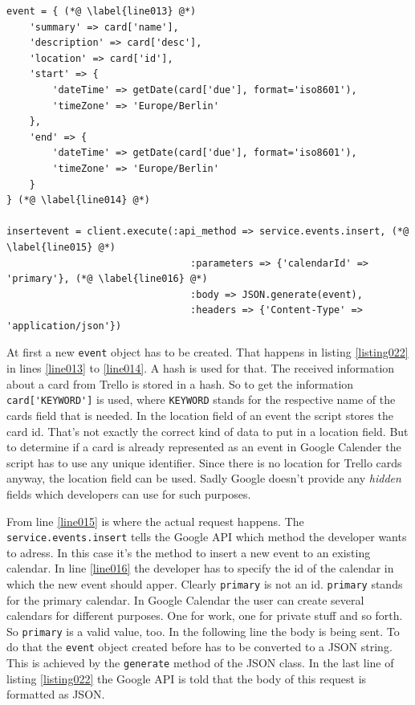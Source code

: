 \begin{lstlisting}[aboveskip=1\baselineskip, caption=Adding a new event to Google Calendar., label=listing022]
event = { (*@ \label{line013} @*)
	'summary' => card['name'],
	'description' => card['desc'],
	'location' => card['id'],
	'start' => {
		'dateTime' => getDate(card['due'], format='iso8601'),
		'timeZone' => 'Europe/Berlin'
	},
	'end' => {
		'dateTime' => getDate(card['due'], format='iso8601'),
		'timeZone' => 'Europe/Berlin'
	}
} (*@ \label{line014} @*)

insertevent = client.execute(:api_method => service.events.insert, (*@ \label{line015} @*)
								:parameters => {'calendarId' => 'primary'}, (*@ \label{line016} @*)
								:body => JSON.generate(event),
								:headers => {'Content-Type' => 'application/json'})
\end{lstlisting}

At first a new \lstinline{event} object has to be created. That happens in listing \ref{listing022} in lines \ref{line013} to \ref{line014}. A hash is used for that. The received information about a card from Trello is stored in a hash. So to get the information \lstinline{card['KEYWORD']} is used, where \lstinline{KEYWORD} stands for the respective name of the cards field that is needed. In the location field of an event the script stores the card id. That's not exactly the correct kind of data to put in a location field. But to determine if a card is already represented as an event in Google Calender the script has to use any unique identifier. Since there is no location for Trello cards anyway, the location field can be used. Sadly Google doesn't provide any \emph{hidden} fields which developers can use for such purposes.

From line \ref{line015} is where the actual request happens. The \lstinline{service.events.insert} tells the Google API which method the developer wants to adress. \cite{google:calapi} In this case it's the method to insert a new event to an existing calendar. In line \ref{line016} the developer has to specify the id of the calendar in which the new event should apper. Clearly \texttt{primary} is not an id. \texttt{primary} stands for the primary calendar. In Google Calendar the user can create several calendars for different purposes. One for work, one for private stuff and so forth. So \texttt{primary} is a valid value, too. In the following line the body is being sent. To do that the \lstinline{event} object created before has to be converted to a JSON string. This is achieved by the \lstinline{generate} method of the JSON class. \cite{json:docu} In the last line of listing \ref{listing022} the Google API is told that the body of this request is formatted as JSON.

